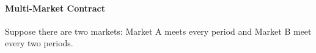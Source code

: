 \documentclass[11pt]{elegantbook}
\begin{document}
\paragraph*{Multi-Market Contract}
Suppose there are two markets: Market A meets every period and Market B meet every two periods.
























































































































































\end{document}
